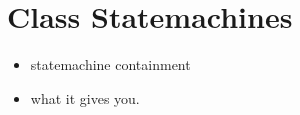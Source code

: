 \section{Class Statemachines}
\label{sec:classdiagrams-statemachines}

\begin{itemize}
	\item statemachine containment
	
	\item what it gives you.


\end{itemize}